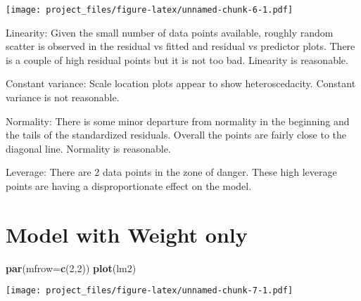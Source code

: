 \documentclass[]{article}
\newenvironment{Shaded}{\begin{snugshade}}{\end{snugshade}}
\newcommand{\KeywordTok}[1]{\textcolor[rgb]{0.13,0.29,0.53}{\textbf{#1}}}
\newcommand{\DataTypeTok}[1]{\textcolor[rgb]{0.13,0.29,0.53}{#1}}
\newcommand{\DecValTok}[1]{\textcolor[rgb]{0.00,0.00,0.81}{#1}}
\newcommand{\StringTok}[1]{\textcolor[rgb]{0.31,0.60,0.02}{#1}}
\newcommand{\OperatorTok}[1]{\textcolor[rgb]{0.81,0.36,0.00}{\textbf{#1}}}
\newcommand{\NormalTok}[1]{#1}
\begin{document}
\texttt{[image: project\_files/figure-latex/unnamed-chunk-6-1.pdf]}

Linearity: Given the small number of data points available, roughly
random scatter is observed in the residual vs fitted and residual vs
predictor plots. There is a couple of high residual points but it is not
too bad. Linearity is reasonable.

Constant variance: Scale location plots appear to show heteroscedacity.
Constant variance is not reasonable.

Normality: There is some minor departure from normality in the beginning
and the tails of the standardized residuals. Overall the points are
fairly close to the diagonal line. Normality is reasonable.

Leverage: There are 2 data points in the zone of danger. These high
leverage points are having a disproportionate effect on the model.

\section{Model with Weight only}\label{model-with-weight-only}

\begin{Shaded}
\begin{Highlighting}[]
\KeywordTok{par}\NormalTok{(}\DataTypeTok{mfrow=}\KeywordTok{c}\NormalTok{(}\DecValTok{2}\NormalTok{,}\DecValTok{2}\NormalTok{))}
\KeywordTok{plot}\NormalTok{(lm2)}
\end{Highlighting}
\end{Shaded}

\texttt{[image: project\_files/figure-latex/unnamed-chunk-7-1.pdf]}

\begin{Shaded}
\end{Shaded}
\end{document}
